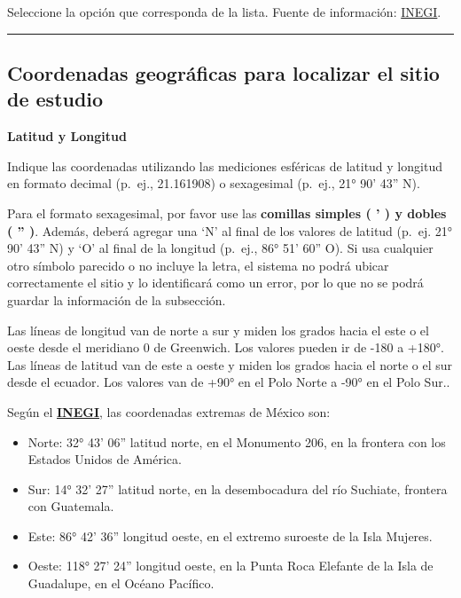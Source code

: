 \documentclass[
]{book}
\providecommand{\tightlist}{%
  \setlength{\itemsep}{0pt}\setlength{\parskip}{0pt}}
\begin{document}
Seleccione la opción que corresponda de la lista.
Fuente de información: \href{https://www.inegi.org.mx/app/ageeml/}{INEGI}.

\begin{center}\rule{0.5\linewidth}{0.5pt}\end{center}

\hypertarget{coordenadas-geogruxe1ficas-para-localizar-el-sitio-de-estudio}{%
\subsection*{Coordenadas geográficas para localizar el sitio de estudio}\label{coordenadas-geogruxe1ficas-para-localizar-el-sitio-de-estudio}}

\textbf{Latitud y Longitud}

Indique las coordenadas utilizando las mediciones esféricas de latitud y longitud en formato decimal (p.~ej., 21.161908) o sexagesimal (p.~ej., 21° 90' 43'' N).

Para el formato sexagesimal, por favor use las \textbf{comillas simples ( ' ) y dobles ( '' )}. Además, deberá agregar una `N' al final de los valores de latitud (p.~ej. 21° 90' 43'' N) y `O' al final de la longitud (p.~ej., 86° 51' 60'' O). Si usa cualquier otro símbolo parecido o no incluye la letra, el sistema no podrá ubicar correctamente el sitio y lo identificará como un error, por lo que no se podrá guardar la información de la subsección.

Las líneas de longitud van de norte a sur y miden los grados hacia el este o el oeste desde el meridiano 0 de Greenwich. Los valores pueden ir de -180 a +180°. Las líneas de latitud van de este a oeste y miden los grados hacia el norte o el sur desde el ecuador. Los valores van de +90° en el Polo Norte a -90° en el Polo Sur..

Según el \href{https://embamex.sre.gob.mx/eua/index.php/es/enterate/391-acerca-de-mexico\#:~:text=Sur\%3A\%2014\%C2\%B0\%2032\%C2\%B4,Guadalupe\%2C\%20en\%20el\%20Oc\%C3\%A9ano\%20Pac\%C3\%ADfico.}{\textbf{INEGI}}, las coordenadas extremas de México son:

\begin{itemize}
\tightlist
\item
  Norte: 32° 43' 06'' latitud norte, en el Monumento 206, en la frontera con los Estados Unidos de América.
\item
  Sur: 14° 32' 27'' latitud norte, en la desembocadura del río Suchiate, frontera con Guatemala.
\item
  Este: 86° 42' 36'' longitud oeste, en el extremo suroeste de la Isla Mujeres.
\item
  Oeste: 118° 27' 24'' longitud oeste, en la Punta Roca Elefante de la Isla de Guadalupe, en el Océano Pacífico.
\end{itemize}
\end{document}
